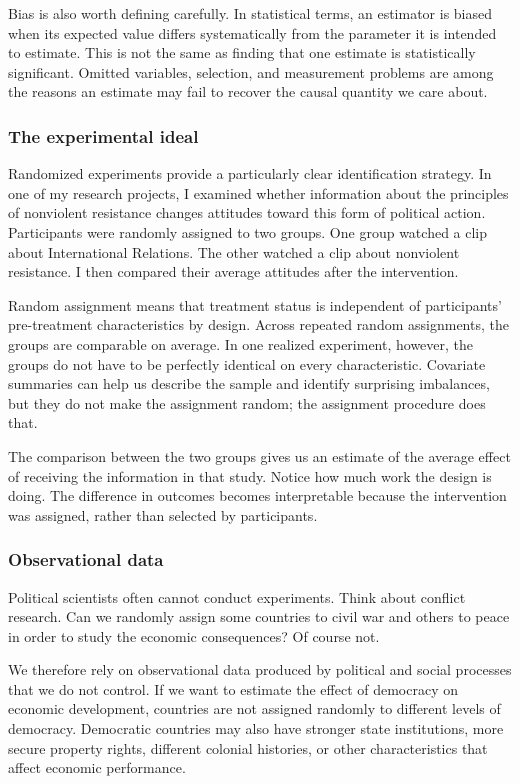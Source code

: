 \documentclass[
  a4paper,
]{scrbook}
\begin{document}
Bias is also worth defining carefully. In statistical terms, an
estimator is biased when its expected value differs systematically from
the parameter it is intended to estimate. This is not the same as
finding that one estimate is statistically significant. Omitted
variables, selection, and measurement problems are among the reasons an
estimate may fail to recover the causal quantity we care about.

\subsubsection{The experimental ideal}\label{the-experimental-ideal}

Randomized experiments provide a particularly clear identification
strategy. In one of my research projects, I examined whether information
about the principles of nonviolent resistance changes attitudes toward
this form of political action. Participants were randomly assigned to
two groups. One group watched a clip about International Relations. The
other watched a clip about nonviolent resistance. I then compared their
average attitudes after the intervention.

Random assignment means that treatment status is independent of
participants' pre-treatment characteristics by design. Across repeated
random assignments, the groups are comparable on average. In one
realized experiment, however, the groups do not have to be perfectly
identical on every characteristic. Covariate summaries can help us
describe the sample and identify surprising imbalances, but they do not
make the assignment random; the assignment procedure does that.

The comparison between the two groups gives us an estimate of the
average effect of receiving the information in that study. Notice how
much work the design is doing. The difference in outcomes becomes
interpretable because the intervention was assigned, rather than
selected by participants.

\subsubsection{Observational data}\label{observational-data}

Political scientists often cannot conduct experiments. Think about
conflict research. Can we randomly assign some countries to civil war
and others to peace in order to study the economic consequences? Of
course not.

We therefore rely on observational data produced by political and social
processes that we do not control. If we want to estimate the effect of
democracy on economic development, countries are not assigned randomly
to different levels of democracy. Democratic countries may also have
stronger state institutions, more secure property rights, different
colonial histories, or other characteristics that affect economic
performance.
\end{document}
